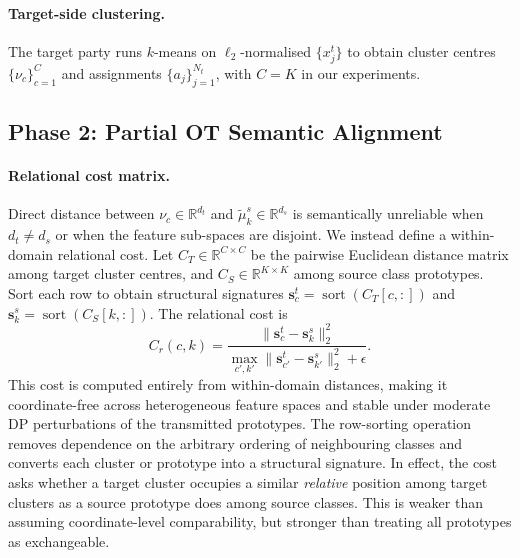 \documentclass[a4paper,fleqn]{cas-sc}
\begin{document}
\paragraph{Target-side clustering.}
The target party runs $k$-means on $\ell_2$-normalised
$\{x_j^t\}$ to obtain cluster centres $\{\nu_c\}_{c=1}^C$ and
assignments $\{a_j\}_{j=1}^{N_t}$, with $C=K$ in our experiments.

\subsection{Phase 2: Partial OT Semantic Alignment}
\label{sec:phase2}

\paragraph{Relational cost matrix.}
Direct distance between $\nu_c \in \mathbb{R}^{d_t}$ and
$\tilde{\mu}_k^s \in \mathbb{R}^{d_s}$ is semantically unreliable when
$d_t \neq d_s$ or when the feature sub-spaces are disjoint.
We instead define a within-domain relational cost.
Let $C_T \in \mathbb{R}^{C\times C}$ be the pairwise Euclidean distance
matrix among target cluster centres, and $C_S \in \mathbb{R}^{K\times K}$
among source class prototypes.
Sort each row to obtain structural signatures
$\mathbf{s}_c^t = \operatorname{sort}(C_T[c,:])$ and
$\mathbf{s}_k^s = \operatorname{sort}(C_S[k,:])$.
The relational cost is
\begin{equation}
  C_r(c,k) = \frac{\|\mathbf{s}_c^t - \mathbf{s}_k^s\|_2^2}
                   {\max_{c',k'}\|\mathbf{s}_{c'}^t - \mathbf{s}_{k'}^s\|_2^2 + \epsilon}.
  \label{eq:relcost}
\end{equation}
This cost is computed entirely from within-domain distances, making it
coordinate-free across heterogeneous feature spaces and stable under moderate
DP perturbations of the transmitted prototypes.
The row-sorting operation removes dependence on the arbitrary ordering of
neighbouring classes and converts each cluster or prototype into a structural
signature. In effect, the cost asks whether a target cluster occupies a
similar \emph{relative} position among target clusters as a source prototype
does among source classes. This is weaker than assuming coordinate-level
comparability, but stronger than treating all prototypes as exchangeable.
\end{document}
